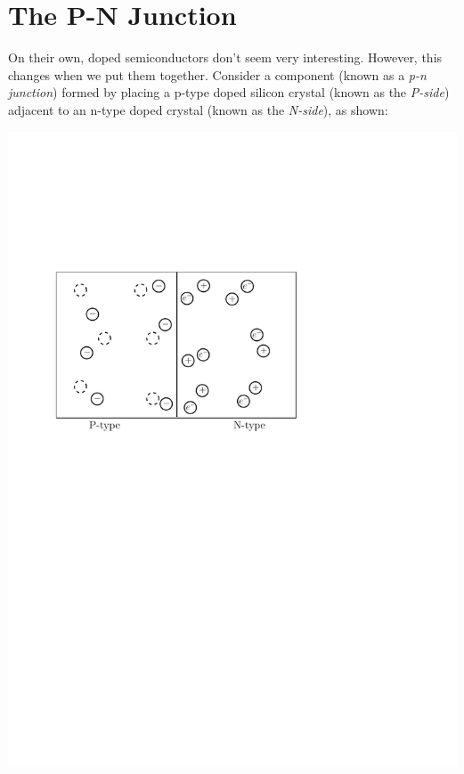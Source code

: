 \documentclass[letterpaper]{article}
\theoremstyle{remark}
\begin{document}
\section{The P-N Junction}
On their own, doped semiconductors don't seem very interesting. However, this changes when we put them together. Consider a component (known as a \emph{p-n junction}) formed by placing a p-type doped silicon crystal (known as the \emph{P-side}) adjacent to an n-type doped crystal (known as the \emph{N-side}), as shown:
\begin{center}
    \includegraphics[scale=0.7]{p_n_junction_1.pdf}
\end{center}
\end{document}
